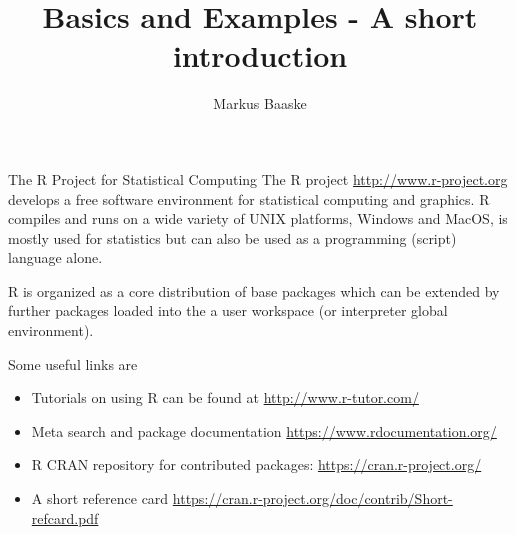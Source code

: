 \documentclass[10pt]{beamer}
\title{\proglang{R} Basics and Examples - A short introduction}
\author{Markus Baaske}
\let\proglang=\textsf
\begin{document}
\maketitle

\begin{frame}{The R Project for Statistical Computing}
The \proglang{R} project \url{http://www.r-project.org} develops a free
software environment for statistical computing and graphics. \proglang{R}
compiles and runs on a wide variety of UNIX platforms, Windows and MacOS, is mostly used for statistics but can also be
used as a programming (script) language alone. \par
\proglang{R} is organized as a core distribution of base packages which can be
extended by further packages loaded into the a user workspace (or interpreter
global environment).\par
Some useful links are
\begin{itemize}
  \item Tutorials on using \proglang{R} can be
  found at \url{http://www.r-tutor.com/}
  \item Meta search and package
  documentation \url{https://www.rdocumentation.org/}
  \item \proglang{R} CRAN repository for contributed packages:
  \url{https://cran.r-project.org/}
  \item A short reference card \url{https://cran.r-project.org/doc/contrib/Short-refcard.pdf}
\end{itemize}
\end{frame}
\end{document}

